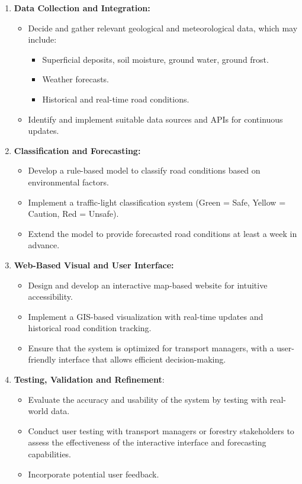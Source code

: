\begin{enumerate}
    \item \textbf{Data Collection and Integration:}
    \begin{itemize}
        \item Decide and gather relevant geological and meteorological data, which may include:
        \begin{itemize}
            \item Superficial deposits, soil moisture, ground water, ground frost.
            \item Weather forecasts.
            \item Historical and real-time road conditions.
        \end{itemize}
        \item Identify and implement suitable data sources and APIs for continuous updates.
    \end{itemize}
    
    \item \textbf{Classification and Forecasting:}
    \begin{itemize}
        \item Develop a rule-based model to classify road conditions based on environmental factors.  
        \item Implement a traffic-light classification system (Green = Safe, Yellow = Caution, Red = Unsafe).  
        \item Extend the model to provide forecasted road conditions at least a week in advance.  
    \end{itemize}
    
    \item \textbf{Web-Based Visual and User Interface:}
    \begin{itemize}
        \item Design and develop an interactive map-based website for intuitive accessibility.
        \item Implement a GIS-based visualization with real-time updates and historical road condition tracking. 
        \item Ensure that the system is optimized for transport managers, with a user-friendly interface that allows efficient decision-making. 
    \end{itemize}
    
    \item \textbf{Testing, Validation and Refinement}:
    \begin{itemize}
        \item Evaluate the accuracy and usability of the system by testing with real-world data.
        \item Conduct user testing with transport managers or forestry stakeholders to assess the effectiveness of the interactive interface and forecasting capabilities.
        \item Incorporate potential user feedback.
    \end{itemize} 
    

\end{enumerate}
